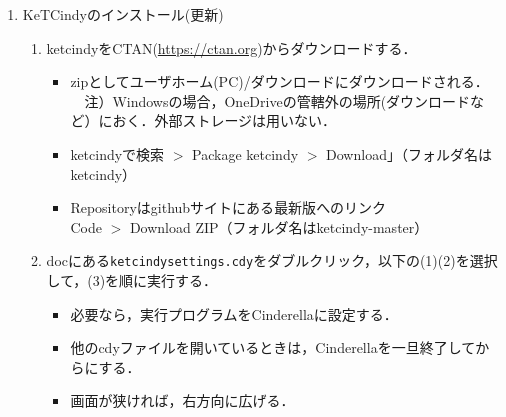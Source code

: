 \documentclass{ujarticle}
\begin{document}
\begin{enumerate}[\bf\large 1.]
\begin{enumerate}[(1)]
\end{enumerate}
 
\item KeTCindyのインストール(更新)\vspace{-2mm}
  \begin{enumerate}[(1)]
  \item ketcindyをCTAN(\url{https://ctan.org})からダウンロードする．
    \begin{itemize}
     \item zipとしてユーザホーム(PC)/ダウンロードにダウンロードされる．\\
　注）Windowsの場合，OneDriveの管轄外の場所(ダウンロードなど）におく．外部ストレージは用いない．
     \item ketcindyで検索 $>$ Package ketcindy $>$ Download」（フォルダ名はketcindy）
     \item Repositoryはgithubサイトにある{\color{red}最新版}へのリンク\\
        \hspace*{10mm}Code $>$ Download ZIP（フォルダ名はketcindy-master）
     \end{itemize}
  \item docにある\verb|ketcindysettings.cdy|をダブルクリック，以下の(1)(2)を選択して，(3)を順に実行する．
    \begin{itemize}
    \item 必要なら，実行プログラムをCinderellaに設定する．
    \item 他のcdyファイルを開いているときは，Cinderellaを一旦終了してからにする．
   \item 画面が狭ければ，右方向に広げる．
   \end{itemize}
  \end{enumerate}



\end{enumerate}
\end{document}
